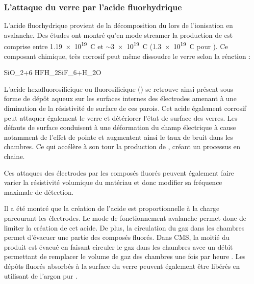 \subsubsection{L'attaque du verre par l'acide fluorhydrique \texorpdfstring{}{HF}}
L'acide fluorhydrique  provient de la décomposition du  lors de l'ionisation en avalanche. Des études ont montré qu'en mode streamer la production de  est comprise entre \num{1.19e19}\si{\per\coulomb} \cite{Lu:2009zzd} et $\sim$\num{3e19}\si{\per\coulomb} \cite{Abbrescia:2006hk} (\num{1.3e19}\si{\per\coulomb} pour \cite{Aielli:2006ih}). Ce composant chimique, très corrosif peut même dissoudre le verre selon la réaction :
\begin{chemeqn}
SiO_2+6 HF\longrightarrow H_2SiF_6+H_2O
\end{chemeqn}
L'acide hexafluorosilicique ou fluorosilicique () se retrouve ainsi présent sous forme de dépôt aqueux sur les surfaces internes des électrodes amenant à une diminution de la résistivité de surface de ces parois. Cet acide également corrosif peut attaquer également le verre et détériorer l'état de surface des verres. Les défauts de surface conduisent à une déformation du champ électrique à cause notamment de l'effet de pointe et augmentent ainsi le taux de bruit dans les chambres. Ce qui accélère à son tour la production de , créant un processus en chaine.

Ces attaques des électrodes par les composés fluorés peuvent également faire varier la résistivité volumique du matériau et donc modifier sa fréquence maximale de détection.

Il a été montré que la création de l'acide  est proportionnelle à la charge parcourant les électrodes. Le mode de fonctionnement avalanche permet donc de limiter la création de cet acide. De plus, la circulation du gaz dans les chambres permet d'évacuer une partie des composés fluorés. Dans CMS, la moitié du  produit est évacué en faisant circuler le gaz dans les chambres avec un débit permettant de remplacer le volume de gaz des chambres une fois par heure \cite{Abbrescia:2006hk}. Les dépôts fluorés absorbés à la surface du verre peuvent également être libérés en utilisant de l'argon pur \cite{Band:2008zza}.

